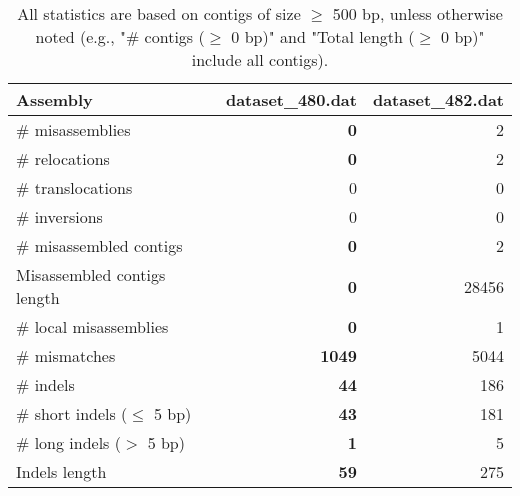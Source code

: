\documentclass[12pt,a4paper]{article}
\begin{document}
\begin{table}[ht]
\begin{center}
\caption{All statistics are based on contigs of size $\geq$ 500 bp, unless otherwise noted (e.g., "\# contigs ($\geq$ 0 bp)" and "Total length ($\geq$ 0 bp)" include all contigs).}
\begin{tabular}{|l*{2}{|r}|}
\hline
Assembly & dataset\_480.dat & dataset\_482.dat \\ \hline
\# misassemblies & {\bf 0} & 2 \\ \hline
\hspace{5mm}\# relocations & {\bf 0} & 2 \\ \hline
\hspace{5mm}\# translocations & 0 & 0 \\ \hline
\hspace{5mm}\# inversions & 0 & 0 \\ \hline
\# misassembled contigs & {\bf 0} & 2 \\ \hline
Misassembled contigs length & {\bf 0} & 28456 \\ \hline
\# local misassemblies & {\bf 0} & 1 \\ \hline
\# mismatches & {\bf 1049} & 5044 \\ \hline
\# indels & {\bf 44} & 186 \\ \hline
\hspace{5mm}\# short indels ($\leq$ 5 bp) & {\bf 43} & 181 \\ \hline
\hspace{5mm}\# long indels ($>$ 5 bp) & {\bf 1} & 5 \\ \hline
Indels length & {\bf 59} & 275 \\ \hline
\end{tabular}
\end{center}
\end{table}
\end{document}
